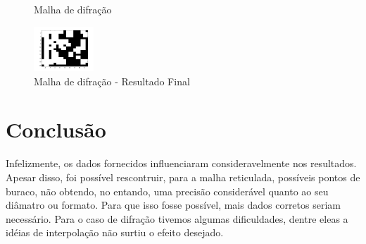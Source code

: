 \documentclass[10pt,a4paper]{article}
\begin{document}
\begin{figure}[h!]
\hspace{5mm}
\hspace{5mm}

\caption{Malha de difração}
\end{figure}

\begin{center}
\begin{figure}[h!]
\begin{center}
\includegraphics[width=0.2\textwidth]{end}
\caption{Malha de difração - Resultado Final }
\end{center}
\end{figure}
\end{center}

\newpage
\section{Conclusão}

Infelizmente, os dados fornecidos influenciaram consideravelmente nos
resultados. Apesar disso, foi possível rescontruir, para a malha reticulada, possíveis pontos de
buraco, não obtendo, no entando, uma precisão considerável quanto ao seu
diâmatro ou formato. Para que isso fosse possível, mais dados corretos
seriam necessário.
Para o caso de difração tivemos algumas dificuldades, dentre eleas a
idéias de interpolação não surtiu o efeito desejado.



\begin{small}
  
\end{small}
\end{document}

